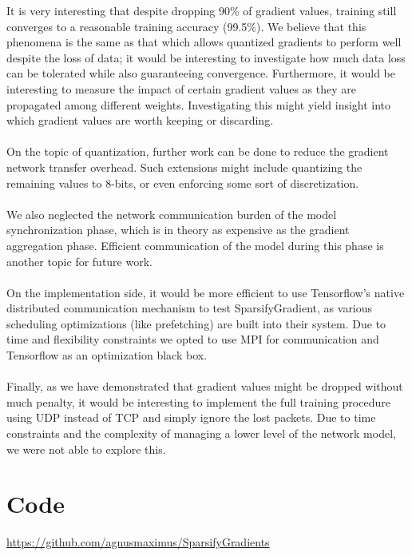 \documentclass[10pt]{article}
\begin{document}
It is very interesting that despite dropping 90\% of gradient values,
training still converges to a reasonable training accuracy (99.5\%). We
believe that this phenomena is the same as that which allows quantized
gradients to perform well despite the loss of data; it would be
interesting to investigate how much data loss can be tolerated while
also guaranteeing convergence. Furthermore, it would be interesting to
measure the impact of certain gradient values as they are propagated
among different weights. Investigating this might yield insight into which gradient values are worth keeping or discarding.
\\
\\
On the topic of quantization, further work can be done to reduce the
gradient network transfer overhead. Such extensions might include
quantizing the remaining values to 8-bits, or even enforcing some sort
of discretization.
\\
\\
We also neglected the network communication burden of the model
synchronization phase, which is in theory as expensive as the gradient
aggregation phase. Efficient communication of the model during this
phase is another topic for future work.
\\
\\
On the implementation side, it would be more efficient to use Tensorflow's native
distributed communication mechanism to test SparsifyGradient, as various scheduling optimizations (like prefetching)
are built into their system. Due to time and flexibility constraints we
opted to use MPI for communication and Tensorflow as an optimization black box.
\\
\\
Finally, as we have demonstrated that gradient values might be dropped
without much penalty, it would be interesting to implement the full
training procedure using UDP instead of TCP and simply ignore the
lost packets. Due to time constraints and the complexity of managing a
lower level of the network model, we were not able to explore this.

\section{Code}
\label{sec-8}
\url{https://github.com/agnusmaximus/SparsifyGradients}
\end{document}
